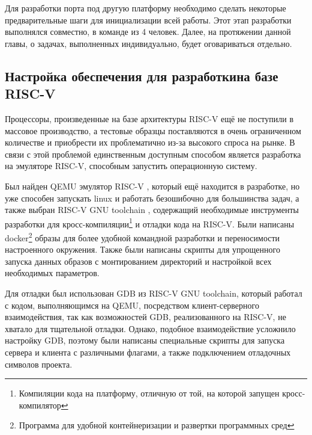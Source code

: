 \newpage
{}

Для разработки порта под другую платформу необходимо сделать некоторые предварительные шаги для инициализации всей работы. Этот этап разработки выполнялся совместно, в команде из 4 человек. 
Далее, на протяжении данной главы, о задачах, выполненных индивидуально, будет оговариваться отдельно.




\subsection[Настройка обеспечения для разработки на базе RISC-V]{Настройка обеспечения для разработки\newline на базе RISC-V}

Процессоры, произведенные на базе архитектуры RISC-V ещё не поступили в массовое производство, а тестовые образцы поставляются в очень ограниченном количестве и приобрести их проблематично из-за высокого спроса на рынке. В связи с этой проблемой единственным доступным способом является разработка на эмуляторе RISC-V, способным запустить операционную систему.

Был найден QEMU эмулятор RISC-V \cite{riscv:qemu}, который ещё находится в разработке, но уже способен запускать linux и работать безошибочно для большинства задач, а также выбран RISC-V GNU toolchain \cite{riscv:gnu}, содержащий необходимые инструменты разработки для кросс-компиляции\footnote{Компиляции кода на платформу, отличную от той, на которой запущен кросс-компилятор} и отладки \cpp кода на RISC-V. Были написаны docker\footnote{Программа для удобной контейнеризации и развертки программных сред} образы для более удобной командной разработки и переносимости настроенного окружения. Также были написаны скрипты для упрощенного запуска данных образов с монтированием директорий и настройкой всех необходимых параметров.

Для отладки был использован GDB из RISC-V GNU toolchain, который работал с кодом, выполняющимся на QEMU, посредством клиент-серверного взаимодействия, так как возможностей GDB, реализованного на RISC-V, не хватало для тщательной отладки. Однако, подобное взаимодействие усложнило настройку GDB, поэтому были написаны специальные скрипты для запуска сервера и клиента с различными флагами, а также подключением отладочных символов проекта.
    
